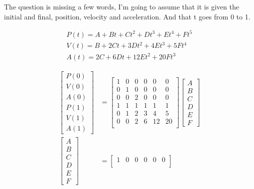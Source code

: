 \begin{solutionbox}[Q1-3?]
    The question is missing a few words, I'm going to assume that it is given the initial and final, position, velocity and acceleration. And that t goes from 0 to 1.

    \begin{align*}
        P(t)=A+Bt+Ct^2+Dt^3+Et^4+Ft^5 \\
        V(t)=B+2Ct+3Dt^2+4Et^3+5Ft^4  \\
        A(t)=2C+6Dt+12Et^2+20Ft^3
    \end{align*}

    \begin{align*}
        \begin{bmatrix}
            P(0) \\
            V(0) \\
            A(0) \\
            P(1) \\
            V(1) \\
            A(1)
        \end{bmatrix}
         & =
        \begin{bmatrix}
            1 & 0 & 0 & 0 & 0  & 0  \\
            0 & 1 & 0 & 0 & 0  & 0  \\
            0 & 0 & 2 & 0 & 0  & 0  \\
            1 & 1 & 1 & 1 & 1  & 1  \\
            0 & 1 & 2 & 3 & 4  & 5  \\
            0 & 0 & 2 & 6 & 12 & 20 \\
        \end{bmatrix}
        \begin{bmatrix}
            A \\B\\C\\D\\E\\F
        \end{bmatrix} \\
        \begin{bmatrix}
            A \\B\\C\\D\\E\\F
        \end{bmatrix}
         & =
        \begin{bmatrix}
            1 & 0 & 0 & 0 & 0  & 0  \\

\end{bmatrix}
\end{align*}
\end{solutionbox}
